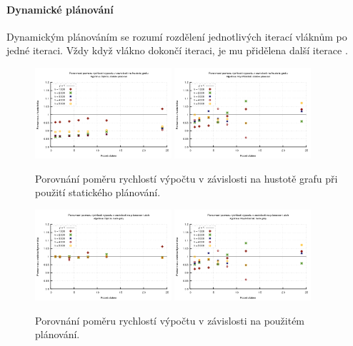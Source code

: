 \paragraph{Dynamické plánování}
Dynamickým plánováním se rozumí rozdělení jednotlivých iterací vláknům po jedné iteraci. Vždy když vlákno dokončí iteraci, je mu přidělena další iterace \cite{w:omp}.

\begin{figure}
    \centering
    \includegraphics[width=0.45\textwidth]{../grafy/02_openMP/02-04-Dijsktra_hustota}
    \includegraphics[width=0.45\textwidth]{../grafy/02_openMP/02-04-Floyd_hustota}
    \caption{Porovnání poměru rychlostí výpočtu v závislosti na hustotě grafu při použití statického plánování.}
    \label{f:mer:pomerhustota}
\end{figure}

\begin{figure}
    \centering
    \includegraphics[width=0.45\textwidth]{../grafy/02_openMP/02-05-Dijsktra_schedule}
    \includegraphics[width=0.45\textwidth]{../grafy/02_openMP/02-05-Floyd_schedule}
    \caption{Porovnání poměru rychlostí výpočtu v závislosti na použitém plánování.}
    \label{f:mer:pomerplanovani}
\end{figure}

